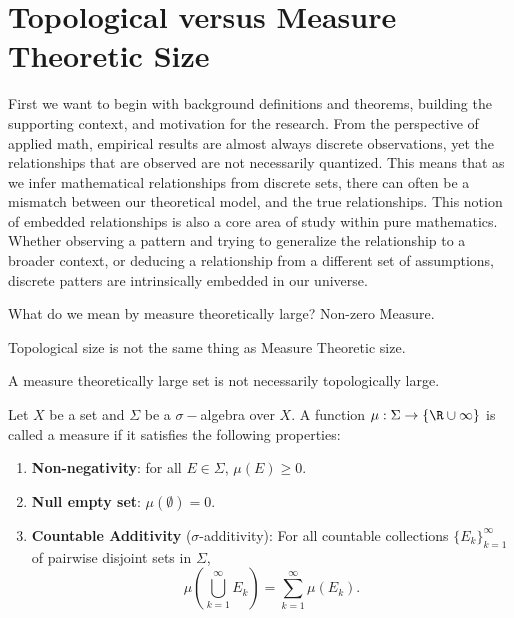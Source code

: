 \section{Topological versus Measure Theoretic Size}

First we want to begin with background definitions and theorems, building the supporting context, and motivation for the research.  From the perspective of applied math, empirical results are almost always discrete observations, yet the relationships that are observed are not necessarily quantized.  This means that as we infer mathematical relationships from discrete sets, there can often be a mismatch between our theoretical model, and the true relationships.  This notion of embedded relationships is also a core area of study within pure mathematics.  Whether observing a pattern and trying to generalize the relationship to a broader context, or deducing a relationship from a different set of assumptions, discrete patters are intrinsically embedded in our universe.  


What do we mean by measure theoretically large? Non-zero Measure.  

Topological size is not the same thing as Measure Theoretic size. 

A measure theoretically large set is not necessarily topologically large.  


\begin{definition}[Measure]
    Let $X$ be a set and $\Sigma$ be a $\sigma-$algebra over $X$.  A function $\mu: \Sigma \to \{\R \cup \infty\}$ is called a measure if it satisfies the following properties:
    \begin{enumerate}
        \item \textbf{Non-negativity}: for all $E \in \Sigma$, $\mu(E)\geq 0$.
        \item \textbf{Null empty set}: $\mu(\emptyset) = 0$. 
        \item \textbf{Countable Additivity} ($\sigma$-additivity): For all countable collections $\{E_k\}_{k=1}^\infty$ of pairwise disjoint sets in $\Sigma$, $$\mu\left( \bigcup_{k=1}^\infty E_k \right) = \sum_{k=1}^\infty \mu(E_k).$$
    \end{enumerate}
\end{definition}

